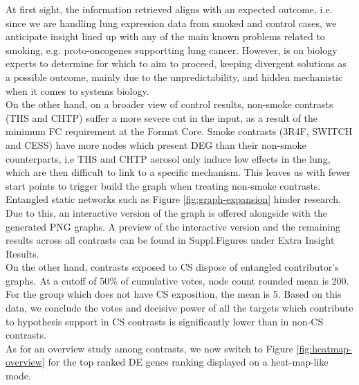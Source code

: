 At first sight, the information retrieved aligns with an expected outcome, i.e. since we are handling lung expression data from smoked and control cases, we anticipate insight lined up with any of the main known problems related to smoking, e.g. proto-oncogenes supportting lung cancer. However, is on biology experts to determine for which to aim to proceed, keeping divergent solutions as a possible outcome, mainly due to the unpredictability, and hidden mechanistic when it comes to systems biology.
\\

On the other hand, on a broader view of control results, non-smoke contrasts (THS and  CHTP) suffer a more severe cut in the input, as a result of the minimum FC requirement at the Format Core. Smoke contrasts (3R4F, SWITCH and CESS) have more nodes which present DEG than their non-smoke counterparts, i.e THS and CHTP aerosol only induce low effects in the lung, which are then difficult to link to a specific mechanism. This leaves us with fewer start points to trigger build the graph when treating non-smoke contrasts.
\\

Entangled static networks such as Figure \ref{fig:graph-expansion} hinder research. Due to this, an interactive version of the graph is offered alongside with the generated PNG graphs. A preview of the interactive version and the remaining results across all contrasts can be found in Suppl.Figures under Extra Insight Results.
\\

On the other hand, contrasts exposed to CS dispose of entangled contributor’s graphs. At a cutoff of 50\% of cumulative votes, node count rounded mean is 200. For the group which does not have CS exposition, the mean is 5. Based on this data, we conclude the votes and decisive power of all the targets which contribute to hypothesis support in CS contrasts is significantly lower than in non-CS contrasts.
\\

As for an overview study among contrasts, we now switch to Figure \ref{fig:heatmap-overview} for the top ranked DE genes ranking displayed on a heat-map-like mode.
\\

